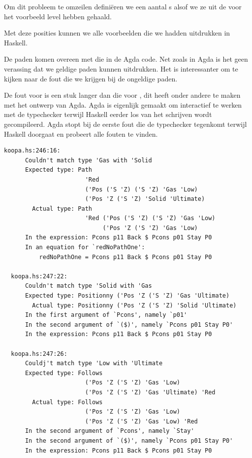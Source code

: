 Om dit probleem te omzeilen definiëren we een aantal s alsof
we ze uit de  voor het voorbeeld level hebben gehaald.


Met deze posities kunnen we alle voorbeelden die we hadden uitdrukken in
Haskell.


De paden komen overeen met die in de Agda code. Net zoals in Agda is het geen
verassing dat we geldige paden kunnen uitdrukken. Het is interessanter om te
kijken naar de fout die we krijgen bij de ongeldige paden.


De fout voor  is een stuk langer dan die voor
, dit heeft onder andere te maken met het ontwerp van
Agda. Agda is eigenlijk gemaakt om interactief te werken met de typechecker
terwijl Haskell eerder los van het schrijven wordt gecompileerd. Agda stopt bij
de eerste fout die de typechecker tegenkomt terwijl Haskell doorgaat en
probeert alle fouten te vinden.

\begin{Verbatim}[fontsize=\small]
  koopa.hs:246:16:
      Couldn't match type 'Gas with 'Solid
      Expected type: Path
                       'Red
                       ('Pos ('S 'Z) ('S 'Z) 'Gas 'Low)
                       ('Pos 'Z ('S 'Z) 'Solid 'Ultimate)
        Actual type: Path
                       'Red ('Pos ('S 'Z) ('S 'Z) 'Gas 'Low)
                            ('Pos 'Z ('S 'Z) 'Gas 'Low)
      In the expression: Pcons p11 Back $ Pcons p01 Stay P0
      In an equation for `redNoPathOne':
          redNoPathOne = Pcons p11 Back $ Pcons p01 Stay P0

  koopa.hs:247:22:
      Couldn't match type 'Solid with 'Gas
      Expected type: Positionny ('Pos 'Z ('S 'Z) 'Gas 'Ultimate)
        Actual type: Positionny ('Pos 'Z ('S 'Z) 'Solid 'Ultimate)
      In the first argument of `Pcons', namely `p01'
      In the second argument of `($)', namely `Pcons p01 Stay P0'
      In the expression: Pcons p11 Back $ Pcons p01 Stay P0

  koopa.hs:247:26:
      Couldj't match type 'Low with 'Ultimate
      Expected type: Follows
                       ('Pos 'Z ('S 'Z) 'Gas 'Low)
                       ('Pos 'Z ('S 'Z) 'Gas 'Ultimate) 'Red
        Actual type: Follows
                       ('Pos 'Z ('S 'Z) 'Gas 'Low)
                       ('Pos 'Z ('S 'Z) 'Gas 'Low) 'Red
      In the second argument of `Pcons', namely `Stay'
      In the second argument of `($)', namely `Pcons p01 Stay P0'
      In the expression: Pcons p11 Back $ Pcons p01 Stay P0
\end{Verbatim}

